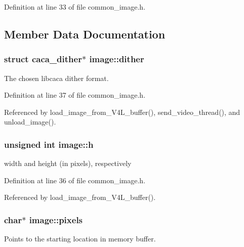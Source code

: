 \-Definition at line 33 of file common\-\_\-image.\-h.



\subsection{\-Member \-Data \-Documentation}
\hypertarget{structimage_a31d7561b213cedafefd358611142691a}{
\subsubsection[{dither}]{\setlength{\rightskip}{0pt plus 5cm}struct caca\-\_\-dither$\ast$ {\bf image\-::dither}}}\label{structimage_a31d7561b213cedafefd358611142691a}


\-The chosen libcaca dither format. 



\-Definition at line 37 of file common\-\_\-image.\-h.



\-Referenced by load\-\_\-image\-\_\-from\-\_\-\-V4\-L\-\_\-buffer(), send\-\_\-video\-\_\-thread(), and unload\-\_\-image().

\hypertarget{structimage_a4fae3d432ea8b597707f29f60124807f}{
\subsubsection[{h}]{\setlength{\rightskip}{0pt plus 5cm}unsigned int {\bf image\-::h}}}\label{structimage_a4fae3d432ea8b597707f29f60124807f}


width and height (in pixels), respectively 



\-Definition at line 36 of file common\-\_\-image.\-h.



\-Referenced by load\-\_\-image\-\_\-from\-\_\-\-V4\-L\-\_\-buffer().

\hypertarget{structimage_abc3d14f227fa7594c545fb7e24b8943f}{
\subsubsection[{pixels}]{\setlength{\rightskip}{0pt plus 5cm}char$\ast$ {\bf image\-::pixels}}}\label{structimage_abc3d14f227fa7594c545fb7e24b8943f}


\-Points to the starting location in memory buffer. 



